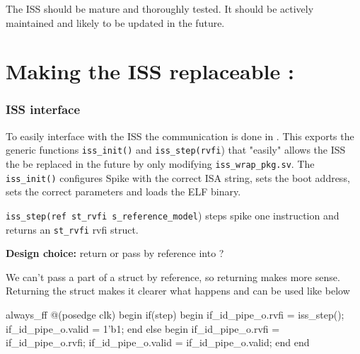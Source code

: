 \begin{enumerate}
\par The ISS should be mature and thoroughly tested. It should be actively maintained and likely to be updated in the future.






\end{enumerate}

\section{Making the ISS replaceable :  }

\subsubsection{ISS interface}

To easily interface with the ISS the communication is done in . This exports the generic functions \lstinline{iss_init()} and \lstinline{iss_step(rvfi}) that "easily" allows the ISS the be replaced in the future by only modifying \lstinline{iss_wrap_pkg.sv}. The \lstinline{iss_init()} configures Spike with the correct ISA string, sets the boot address, sets the correct parameters and loads the ELF binary. 

\lstinline{iss_step(ref st_rvfi s_reference_model}) steps spike one instruction and returns an \lstinline{st_rvfi} rvfi struct.

\textbf{Design choice:} return  or pass by reference into ?

We can't pass a part of a struct by reference, so returning makes more sense.
Returning the struct makes it clearer what happens and can be used like below

\begin{systemverilog}
always_ff @(posedge clk) begin
    if(step) begin
        if_id_pipe_o.rvfi = iss_step();
        if_id_pipe_o.valid = 1'b1;
    end
    else begin
        if_id_pipe_o.rvfi = if_id_pipe_o.rvfi;
        if_id_pipe_o.valid = if_id_pipe_o.valid;
    end
end

\end{systemverilog}

